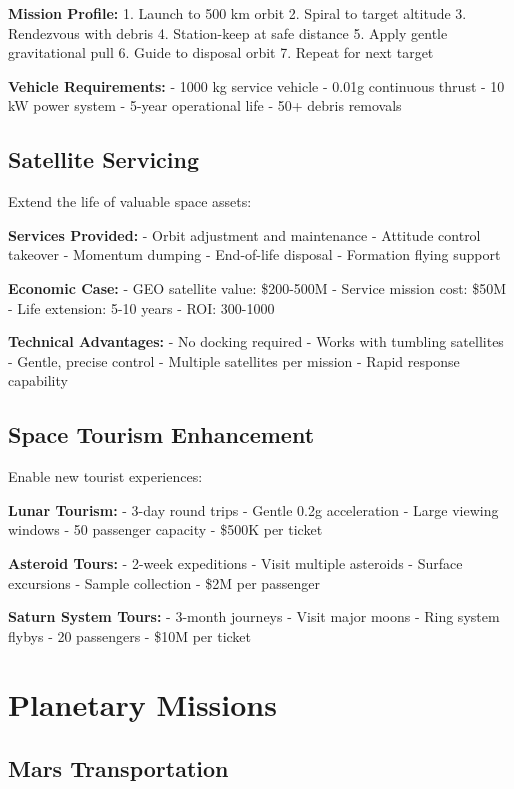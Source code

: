 \documentclass[12pt,letterpaper]{book}
\theoremstyle{definition}
\theoremstyle{plain}
\theoremstyle{remark}
\begin{document}
{{{{{\textbf{Mission Profile:}
1. Launch to 500 km orbit
2. Spiral to target altitude
3. Rendezvous with debris
4. Station-keep at safe distance
5. Apply gentle gravitational pull
6. Guide to disposal orbit
7. Repeat for next target

\textbf{Vehicle Requirements:}
- 1000 kg service vehicle
- 0.01g continuous thrust
- 10 kW power system
- 5-year operational life
- 50+ debris removals

\subsection{Satellite Servicing}

Extend the life of valuable space assets:

\textbf{Services Provided:}
- Orbit adjustment and maintenance
- Attitude control takeover
- Momentum dumping
- End-of-life disposal
- Formation flying support

\textbf{Economic Case:}
- GEO satellite value: \$200-500M
- Service mission cost: \$50M
- Life extension: 5-10 years
- ROI: 300-1000%

\textbf{Technical Advantages:}
- No docking required
- Works with tumbling satellites
- Gentle, precise control
- Multiple satellites per mission
- Rapid response capability

\subsection{Space Tourism Enhancement}

Enable new tourist experiences:

\textbf{Lunar Tourism:}
- 3-day round trips
- Gentle 0.2g acceleration
- Large viewing windows
- 50 passenger capacity
- \$500K per ticket

\textbf{Asteroid Tours:}
- 2-week expeditions
- Visit multiple asteroids
- Surface excursions
- Sample collection
- \$2M per passenger

\textbf{Saturn System Tours:}
- 3-month journeys
- Visit major moons
- Ring system flybys
- 20 passengers
- \$10M per ticket

\section{Planetary Missions}

\subsection{Mars Transportation}

}}}}}
\end{document}
